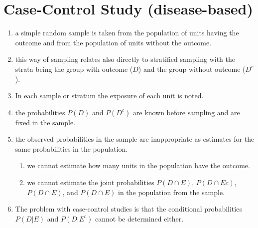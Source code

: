 \section{Case-Control Study (disease-based)}

\begin{enumerate}
    \item  a simple random sample is taken from the population of units having the outcome and from the population of units without the outcome.
    \hfill \cite{statistics/book/Statistics-for-Data-Scientists/Maurits-Kaptein}

    \item this way of sampling relates also directly to stratified sampling with the strata being the group with outcome ($D$) and the group without outcome ($D^c$).
    \hfill \cite{statistics/book/Statistics-for-Data-Scientists/Maurits-Kaptein}

    \item In each sample or stratum the exposure of each unit is noted.
    \hfill \cite{statistics/book/Statistics-for-Data-Scientists/Maurits-Kaptein}

    \item the probabilities $P (D)$ and $P (D^c)$ are known before sampling and are fixed in the sample.
    \hfill \cite{statistics/book/Statistics-for-Data-Scientists/Maurits-Kaptein}

    \item the observed probabilities in the sample are inappropriate as estimates for the same probabilities in the population. 
    \hfill \cite{statistics/book/Statistics-for-Data-Scientists/Maurits-Kaptein}
    \begin{enumerate}
        \item we cannot estimate how many units in the population have the outcome.
        \hfill \cite{statistics/book/Statistics-for-Data-Scientists/Maurits-Kaptein}

        \item we cannot estimate the joint probabilities $P (D \cap E)$, $P (D \cap Ec)$, $P (D \cap E)$, and $P (D \cap E)$ in the population from the sample.
        \hfill \cite{statistics/book/Statistics-for-Data-Scientists/Maurits-Kaptein}
    \end{enumerate}

    \item The problem with case-control studies is that the conditional probabilities $P (D|E)$ and $P (D|E^c)$ cannot be determined either.
    \hfill \cite{statistics/book/Statistics-for-Data-Scientists/Maurits-Kaptein}
\end{enumerate}








